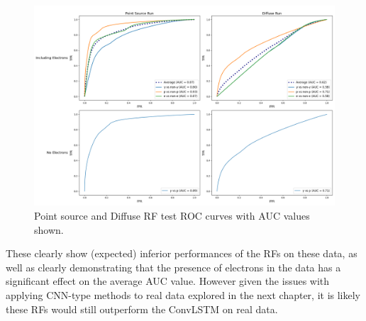 \begin{figure}[ht] 
        \centering \includegraphics[width=1.0\columnwidth]{figures/rfplot.png}

        \caption{
                \label{fig:rfplot} %
                Point source and Diffuse RF test ROC curves with AUC values shown.
        }
\end{figure}

These clearly show (expected) inferior performances of the RFs on these data, as well as clearly demonstrating that the presence of electrons in the data has a significant effect on the average AUC value. However given the issues with applying CNN-type methods to real data explored in the next chapter, it is likely these RFs would still outperform the ConvLSTM on real data.


